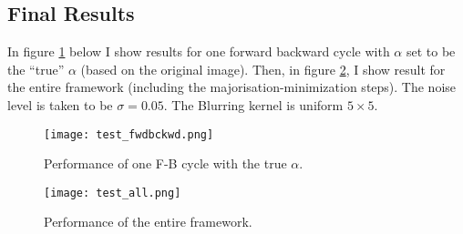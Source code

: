 \documentclass[paper=a4, fontsize=11pt]{scrartcl} %
\numberwithin{equation}{section} %
\numberwithin{figure}{section} %
\numberwithin{table}{section} %
\begin{document}
\subsection{Final Results}
In figure \ref{fwdbckwd} below I show results for one forward backward
cycle with $\alpha$ set to be the ``true'' $\alpha$ (based on the
original image). Then, in figure \ref{all}, I show result for the
entire framework (including the majorisation-minimization steps). The
noise level is taken to be $\sigma = 0.05$. The Blurring kernel is
uniform $5 \times 5$.
 
\begin{figure}[ht!]
\centering
\texttt{[image: test\_fwdbckwd.png]}
\caption{Performance of one F-B cycle with the true $\alpha$. \label{fwdbckwd}}
\end{figure}


\begin{figure}[ht!]
\centering
\texttt{[image: test\_all.png]}
\caption{Performance of the entire framework. \label{all}}
\end{figure}



\end{document}
